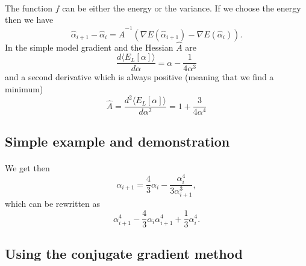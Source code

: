 \documentclass[%
twoside,                 %
final,                   %
10pt]{article}
\begin{document}
\paragraph{}
The function $f$ can be either the energy or the variance.  If we choose the energy then we have
\begin{equation*}
\hat{\alpha}_{i+1}-\hat{\alpha}_i=\hat{A}^{-1}(\nabla E(\hat{\alpha}_{i+1})-\nabla E(\hat{\alpha}_i)).
\end{equation*}
In the simple model gradient and the Hessian $\hat{A}$ are
\begin{equation*}
\frac{d\langle  E_L[\alpha]\rangle}{d\alpha} = \alpha-\frac{1}{4\alpha^3}
\end{equation*}
and a second derivative which is always positive (meaning that we find a minimum)
\begin{equation*}
\hat{A}= \frac{d^2\langle  E_L[\alpha]\rangle}{d\alpha^2} = 1+\frac{3}{4\alpha^4}
\end{equation*}



\subsection*{Simple example and demonstration}

\paragraph{}
We get then
\begin{equation*}
\alpha_{i+1}=\frac{4}{3}\alpha_i-\frac{\alpha_i^4}{3\alpha_{i+1}^3},
\end{equation*}
which can be rewritten as
\begin{equation*}
\alpha_{i+1}^4-\frac{4}{3}\alpha_i\alpha_{i+1}^4+\frac{1}{3}\alpha_i^4.
\end{equation*}



\subsection*{Using the conjugate gradient method}

\end{document}
